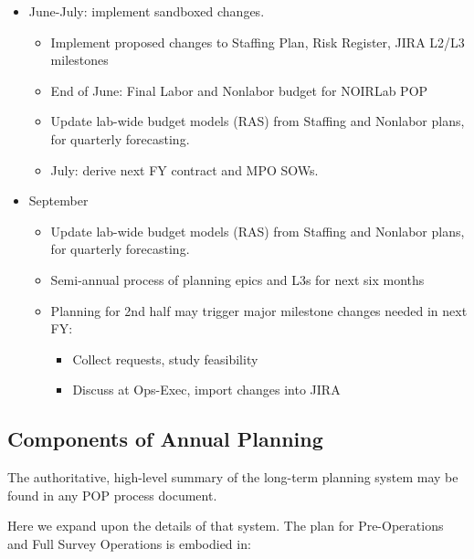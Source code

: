 \begin{itemize}
\begin{itemize}
\begin{itemize}
            \item Early May Department management teams facilitate team-level sandbox pitches (including L2/L3 milestones, changes to spending plans)
            \item Late May: Sandboxing Workshop, for all ops teams and \gls{Director}'s Office.
         \end{itemize}
   \end{itemize}
\item June-July: implement sandboxed changes.
   \begin{itemize}
      \item Implement proposed changes to Staffing Plan, \gls{Risk} Register, \gls{JIRA} L2/L3 milestones
      \item End of June: Final Labor and Nonlabor budget for \gls{NOIRLab} \gls{POP}
      \item Update lab-wide budget models (\gls{RAS}) from Staffing and Nonlabor plans, for quarterly forecasting.
      \item July: derive next \gls{FY} contract and \gls{MPO} \glspl{SOW}.
   \end{itemize}
\item September
   \begin{itemize}
      \item Update lab-wide budget models (\gls{RAS}) from Staffing and Nonlabor plans, for quarterly forecasting.
      \item Semi-annual process of planning epics and L3s for next six months
      \item Planning for 2nd half may trigger major milestone changes needed in next \gls{FY}:
      \begin{itemize}
         \item Collect requests, study feasibility
         \item Discuss at Ops-Exec, import changes into \gls{JIRA}
      \end{itemize}
   \end{itemize}
\end{itemize}

\subsection{Components of Annual Planning}
\label{sec:annual-planning}
The authoritative, high-level summary of the long-term planning system may be found in any POP process document.

Here we expand upon the details of that system.
The plan for Pre-Operations and Full Survey \gls{Operations} is embodied in:

